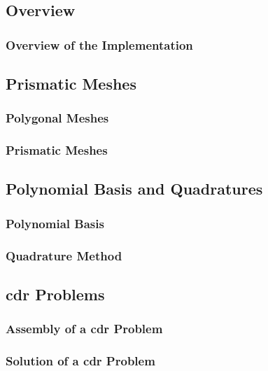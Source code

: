 \subsection{Overview}

\begin{frame}
    \frametitle{Overview of the Implementation}

    
\end{frame}

\subsection{Prismatic Meshes}

\begin{frame}
    \frametitle{Polygonal Meshes}

    
\end{frame}

\begin{frame}
    \frametitle{Prismatic Meshes}

    
\end{frame}

\subsection{Polynomial Basis and Quadratures}

\begin{frame}
    \frametitle{Polynomial Basis}

    
\end{frame}

\begin{frame}
    \frametitle{Quadrature Method}

    
\end{frame}

\subsection{\acrshort{cdr} Problems}

\begin{frame}
    \frametitle{Assembly of a \acrshort{cdr} Problem}

    
\end{frame}

\begin{frame}
    \frametitle{Solution of a \acrshort{cdr} Problem}

    
\end{frame}